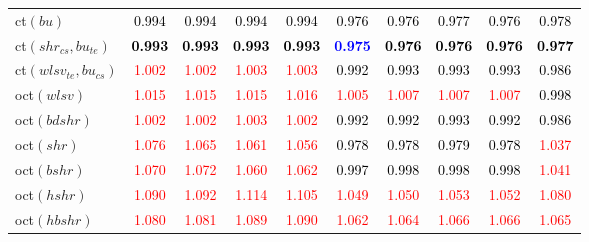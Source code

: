 \begin{tabular}[t]{>{\centering\arraybackslash}m{2.5cm}ccccccccc}
ct$(bu)$ & \textcolor{black}{0.994} & \textcolor{black}{0.994} & \textcolor{black}{0.994} & \textcolor{black}{0.994} & \textcolor{black}{0.976} & \textcolor{black}{0.976} & \textcolor{black}{0.977} & \textcolor{black}{0.976} & \textcolor{black}{0.978}\\
ct$(shr_{cs}, bu_{te})$ & \textcolor{black}{\textbf{0.993}} & \textcolor{black}{\textbf{0.993}} & \textcolor{black}{\textbf{0.993}} & \textcolor{black}{\textbf{0.993}} & \textcolor{blue}{\textbf{0.975}} & \textcolor{black}{\textbf{0.976}} & \textcolor{black}{\textbf{0.976}} & \textcolor{black}{\textbf{0.976}} & \textcolor{black}{\textbf{0.977}}\\
ct$(wlsv_{te}, bu_{cs})$ & \textcolor{red}{1.002} & \textcolor{red}{1.002} & \textcolor{red}{1.003} & \textcolor{red}{1.003} & \textcolor{black}{0.992} & \textcolor{black}{0.993} & \textcolor{black}{0.993} & \textcolor{black}{0.993} & \textcolor{black}{0.986}\\
oct$(wlsv)$ & \textcolor{red}{1.015} & \textcolor{red}{1.015} & \textcolor{red}{1.015} & \textcolor{red}{1.016} & \textcolor{red}{1.005} & \textcolor{red}{1.007} & \textcolor{red}{1.007} & \textcolor{red}{1.007} & \textcolor{black}{0.998}\\
oct$(bdshr)$ & \textcolor{red}{1.002} & \textcolor{red}{1.002} & \textcolor{red}{1.003} & \textcolor{red}{1.002} & \textcolor{black}{0.992} & \textcolor{black}{0.992} & \textcolor{black}{0.993} & \textcolor{black}{0.992} & \textcolor{black}{0.986}\\
oct$(shr)$ & \textcolor{red}{1.076} & \textcolor{red}{1.065} & \textcolor{red}{1.061} & \textcolor{red}{1.056} & \textcolor{black}{0.978} & \textcolor{black}{0.978} & \textcolor{black}{0.979} & \textcolor{black}{0.978} & \textcolor{red}{1.037}\\
oct$(bshr)$ & \textcolor{red}{1.070} & \textcolor{red}{1.072} & \textcolor{red}{1.060} & \textcolor{red}{1.062} & \textcolor{black}{0.997} & \textcolor{black}{0.998} & \textcolor{black}{0.998} & \textcolor{black}{0.998} & \textcolor{red}{1.041}\\
oct$(hshr)$ & \textcolor{red}{1.090} & \textcolor{red}{1.092} & \textcolor{red}{1.114} & \textcolor{red}{1.105} & \textcolor{red}{1.049} & \textcolor{red}{1.050} & \textcolor{red}{1.053} & \textcolor{red}{1.052} & \textcolor{red}{1.080}\\
oct$(hbshr)$ & \textcolor{red}{1.080} & \textcolor{red}{1.081} & \textcolor{red}{1.089} & \textcolor{red}{1.090} & \textcolor{red}{1.062} & \textcolor{red}{1.064} & \textcolor{red}{1.066} & \textcolor{red}{1.066} & \textcolor{red}{1.065}\\

\end{tabular}
